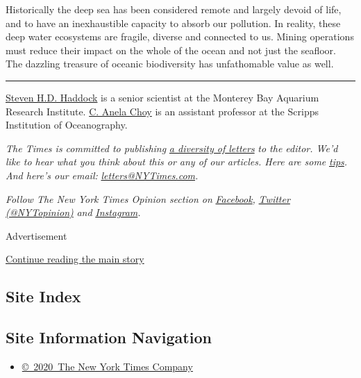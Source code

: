 Historically the deep sea has been considered remote and largely devoid
of life, and to have an inexhaustible capacity to absorb our pollution.
In reality, these deep water ecosystems are fragile, diverse and
connected to us. Mining operations must reduce their impact on the whole
of the ocean and not just the seafloor. The dazzling treasure of oceanic
biodiversity has unfathomable value as well.

\begin{center}\rule{0.5\linewidth}{\linethickness}\end{center}

\href{https://www.mbari.org/haddock-steven/}{Steven H.D. Haddock} is a
senior scientist at the Monterey Bay Aquarium Research Institute.
\href{https://choylab.ucsd.edu/\#people}{C. Anela Choy} is an assistant
professor at the Scripps Institution of Oceanography.

\emph{The Times is committed to publishing}
\href{https://www.nytimes3xbfgragh.onion/2019/01/31/opinion/letters/letters-to-editor-new-york-times-women.html}{\emph{a
diversity of letters}} \emph{to the editor. We'd like to hear what you
think about this or any of our articles. Here are some}
\href{https://help.nytimes3xbfgragh.onion/hc/en-us/articles/115014925288-How-to-submit-a-letter-to-the-editor}{\emph{tips}}\emph{.
And here's our email:}
\href{mailto:letters@NYTimes.com}{\emph{letters@NYTimes.com}}\emph{.}

\emph{Follow The New York Times Opinion section on}
\href{https://www.facebookcorewwwi.onion/nytopinion}{\emph{Facebook}}\emph{,}
\href{http://twitter.com/NYTOpinion}{\emph{Twitter (@NYTopinion)}}
\emph{and}
\href{https://www.instagram.com/nytopinion/}{\emph{Instagram}}\emph{.}

Advertisement

\protect\hyperlink{after-bottom}{Continue reading the main story}

\hypertarget{site-index}{%
\subsection{Site Index}\label{site-index}}

\hypertarget{site-information-navigation}{%
\subsection{Site Information
Navigation}\label{site-information-navigation}}

\begin{itemize}
\tightlist
\item
  \href{https://help.nytimes3xbfgragh.onion/hc/en-us/articles/115014792127-Copyright-notice}{©~2020~The
  New York Times Company}
\end{itemize}

